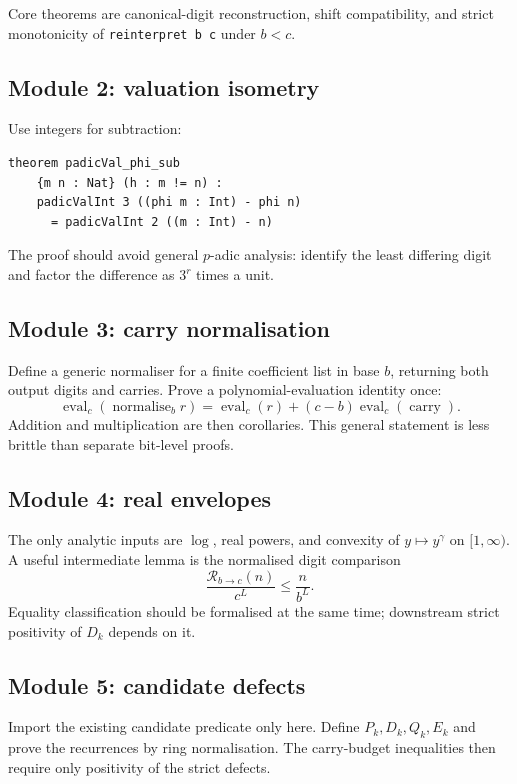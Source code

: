 \documentclass[11pt]{article}
\theoremstyle{definition}
\theoremstyle{remark}
\newcommand{\Rad}{\mathcal R}
\begin{document}
Core theorems are canonical-digit reconstruction, shift compatibility, and
strict monotonicity of \texttt{reinterpret b c} under $b<c$.

\subsection{Module 2: valuation isometry}

Use integers for subtraction:

\begin{lstlisting}[language={}]
theorem padicVal_phi_sub
    {m n : Nat} (h : m != n) :
    padicValInt 3 ((phi m : Int) - phi n)
      = padicValInt 2 ((m : Int) - n)
\end{lstlisting}

The proof should avoid general $p$-adic analysis: identify the least differing
digit and factor the difference as $3^r$ times a unit.

\subsection{Module 3: carry normalisation}

Define a generic normaliser for a finite coefficient list in base $b$,
returning both output digits and carries.  Prove a polynomial-evaluation
identity once:
\[
 \operatorname{eval}_c(\operatorname{normalise}_b r)
 =\operatorname{eval}_c(r)+(c-b)\operatorname{eval}_c(\operatorname{carry}).
\]
Addition and multiplication are then corollaries.  This general statement is
less brittle than separate bit-level proofs.

\subsection{Module 4: real envelopes}

The only analytic inputs are $\log$, real powers, and convexity of
$y\mapsto y^\gamma$ on $[1,\infty)$.  A useful intermediate lemma is the
normalised digit comparison
\[
 \frac{\Rad_{b\to c}(n)}{c^L}\le\frac{n}{b^L}.
\]
Equality classification should be formalised at the same time; downstream
strict positivity of $D_k$ depends on it.

\subsection{Module 5: candidate defects}

Import the existing candidate predicate only here.  Define $P_k,D_k,Q_k,E_k$
and prove the recurrences by ring normalisation.  The carry-budget inequalities
then require only positivity of the strict defects.
\end{document}
